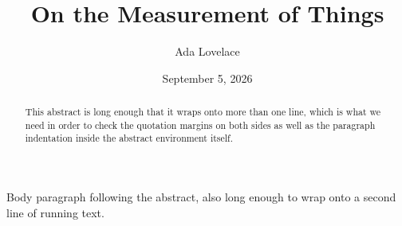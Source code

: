 \documentclass[a4paper,10pt]{article}
\title{On the Measurement of Things}
\author{Ada Lovelace}
\date{September 5, 2026}
\begin{document}
\maketitle
\begin{abstract}
This abstract is long enough that it wraps onto more than one line, which is
what we need in order to check the quotation margins on both sides as well as
the paragraph indentation inside the abstract environment itself.
\end{abstract}

Body paragraph following the abstract, also long enough to wrap onto a second
line of running text.
\end{document}
